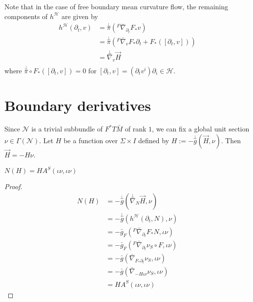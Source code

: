 Note that in the case of free boundary mean curvature flow, the remaining components of $h^{\mathcal{H} }$ are given by
\begin{equation*}
\begin{split}
    h^{\mathcal{H} }(\partial_t, v) 
&= \overset{\perp }{\pi} ({}^F \bar{\nabla }_{\partial _t} F_* v)  \\
&= \overset{\perp }{\pi} ({}^F \bar{\nabla }_{v} F_* \partial _t+F_*([\partial_t,v]))  \\
&= \overset{\perp }{\nabla} _v \vec{H}  \\
\end{split}
\end{equation*} 
where $\overset{\perp }{\pi} \circ  F_*([\partial_t,v])=0$ for $[\partial _t, v]=(\partial _t v^i) \partial _i \in \mathcal{H} $.

\section{Boundary derivatives} \label{sec:bd}

Since $\mathcal{N} $ is a trivial subbundle of $F^*T\bar{M} $  of rank $1$, we can fix a global unit section $\nu \in \Gamma (\mathcal{N} )$. Let $H$ be a function over $\Sigma \times I$ defined by $H:=-\overset{\perp }{g} (\vec{H},\nu )$. Then $\vec{H}=-H \nu $.

\begin{theorem}
    $N(H)=H A^S(\iota \nu , \iota \nu )$ 
\end{theorem}

\begin{proof}

    \begin{equation*}
    \begin{split}
        N(H)
    &= - \overset{\perp }{g} (\overset{\perp }{\nabla} _{N}\vec{H}, \nu )\\
    &= - \overset{\perp }{g} (h^{\mathcal{H} }(\partial _t, N), \nu )\\
    &=- \bar{g}_F({}^F \bar{\nabla } _{\partial_t }F_*N, \iota \nu)\\
    &= - \bar{g}_F({}^F \bar{\nabla } _{\partial_t } \nu _S \circ F, \iota \nu)\\
    &= - \bar{g}(\bar{\nabla }_{F_* \partial_t} \nu _S,\iota \nu )\\
    &= - \bar{g}(\bar{\nabla }_{-H \iota \nu } \nu _S,\iota \nu )\\
    &= H A^S(\iota \nu , \iota \nu )
    \end{split}
    \end{equation*}  
\end{proof}

